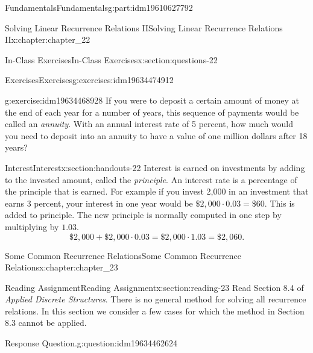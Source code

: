 \documentclass[oneside,10pt,]{book}
\numberwithin{equation}{section}
\begin{document}
\begin{partptx}{Fundamentals}{}{Fundamentals}{}{}{g:part:idm19610627792}
\begin{chapterptx}{Solving Linear Recurrence Relations II}{}{Solving Linear Recurrence Relations II}{}{}{x:chapter:chapter_22}
\begin{sectionptx}{In-Class Exercises}{}{In-Class Exercises}{}{}{x:section:questions-22}
\begin{exercises-subsection-numberless}{Exercises}{}{Exercises}{}{}{g:exercises:idm19634474912}
\begin{exercisegroup}
\begin{divisionexerciseeg}{4}{}{}{g:exercise:idm19634468928}
If you were to deposit a certain amount of money at the end of each year for a number of years, this sequence of payments would be called an \emph{annuity}.  With an annual interest rate of 5 percent, how much would you need to deposit into an annuity to have a value of one million dollars after 18 years?%
\end{divisionexerciseeg}%
\end{exercisegroup}
\par\medskip\noindent
\end{exercises-subsection-numberless}
\end{sectionptx}
%
%
\typeout{************************************************}
\typeout{************************************************}
%
\begin{sectionptx}{Interest}{}{Interest}{}{}{x:section:handouts-22}
Interest is earned on investments by adding to the invested amount, called the \emph{principle}. An interest rate is a percentage of the principle that is earned.  For example if you invest \textdollar{}2,000 in an investment  that earns 3 percent, your interest in one year would be \(\$2,000\cdot 0.03 =\$60\).  This is added to principle.  The new principle is normally computed in one step by multiplying by \(1.03\).%
\begin{equation*}
\$2,000+ \$2,000\cdot 0.03 =\$2,000\cdot 1.03 =  \$2,060.
\end{equation*}
%
\end{sectionptx}
\end{chapterptx}
%
\typeout{************************************************}
\typeout{************************************************}
%
\begin{chapterptx}{Some Common Recurrence Relations}{}{Some Common Recurrence Relations}{}{}{x:chapter:chapter_23}
\index{}%
%
%
\typeout{************************************************}
\typeout{************************************************}
%
\begin{sectionptx}{Reading Assignment}{}{Reading Assignment}{}{}{x:section:reading-23}
Read Section 8.4 of \emph{Applied Discrete Structures}. There is no general method for solving all recurrence relations.  In this section we consider a few cases for which the method in Section 8.3 cannot be applied.%
\begin{question}{Response Question.}{g:question:idm19634462624}%

\end{question}
\end{sectionptx}
\end{chapterptx}
\end{partptx}
\end{document}
